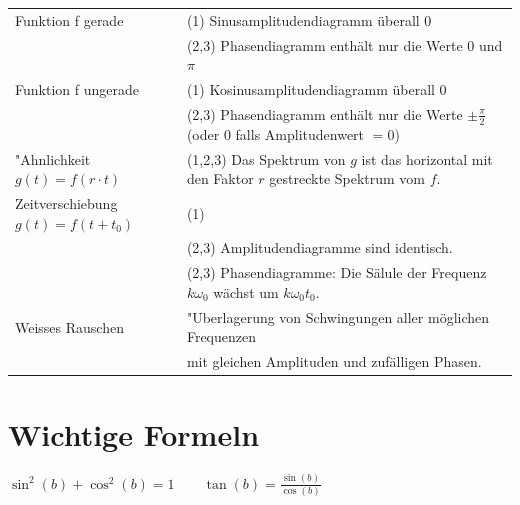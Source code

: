 \begin{tabular}{ll}
	Funktion f gerade 
	& (1) Sinusamplitudendiagramm überall 0 \\
	& (2,3) Phasendiagramm enthält nur die Werte $0$ und $\pi$ \\
	Funktion f ungerade
	& (1) Kosinusamplitudendiagramm überall 0 \\
	& (2,3) Phasendiagramm enthält nur die Werte $\pm \frac{\pi}{2}$ (oder $0$ falls Amplitudenwert $=0$) \\
	"Ahnlichkeit $g(t) = f(r \cdot t) $
	& (1,2,3) Das Spektrum von $g$ ist das horizontal mit den Faktor $r$ gestreckte Spektrum vom $f$. \\
	Zeitverschiebung $g(t) = f(t + t_0) $
	& (1) \verweis{Fourier_Zeitverschiebung}{Zeitverschiebung} \\
	& (2,3) Amplitudendiagramme sind identisch. \\
	& (2,3) Phasendiagramme: Die Sälule der Frequenz $k \omega_0$ wächst um $k\omega_0 t_0$. \\
	Weisses Rauschen
	& "Uberlagerung von Schwingungen aller möglichen Frequenzen \\
	& mit gleichen Amplituden und zufälligen Phasen. 

\end{tabular}

\label{LastPage}
\section{Wichtige Formeln}
	$\sin^2(b)+\cos^2(b)=1 \qquad \tan(b)=\frac{\sin(b)}{\cos(b)}$	
	
